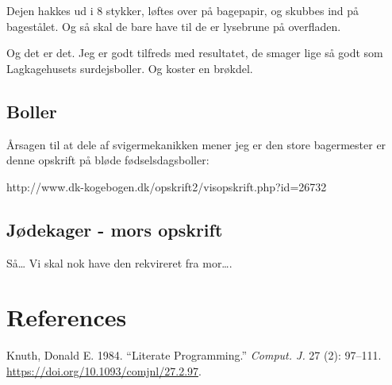 \documentclass[
  letterpaper,
  DIV=11,
  numbers=noendperiod]{scrreprt}
\newlength{\cslhangindent}
\newlength{\cslentryspacingunit} %
\newenvironment{CSLReferences}[2] %
 {%
  \setlength{\parindent}{0pt}
  \ifodd #1
  \let\oldpar\par
  \def\par{\hangindent=\cslhangindent\oldpar}
  \fi
  \setlength{\parskip}{#2\cslentryspacingunit}
 }%
 {}
\begin{document}
Dejen hakkes ud i 8 stykker, løftes over på bagepapir, og skubbes ind på
bagestålet. Og så skal de bare have til de er lysebrune på overfladen.

Og det er det. Jeg er godt tilfreds med resultatet, de smager lige så
godt som Lagkagehusets surdejsboller. Og koster en brøkdel.

\hypertarget{boller}{%
\section{Boller}\label{boller}}

Årsagen til at dele af svigermekanikken mener jeg er den store
bagermester er denne opskrift på bløde fødselsdagsboller:

http://www.dk-kogebogen.dk/opskrift2/visopskrift.php?id=26732

\hypertarget{juxf8dekager---mors-opskrift}{%
\section{Jødekager - mors opskrift}\label{juxf8dekager---mors-opskrift}}

Så\ldots{} Vi skal nok have den rekvireret fra mor\ldots.


\hypertarget{references}{%
\chapter*{References}\label{references}}


\hypertarget{refs}{}
\begin{CSLReferences}{1}{0}
\leavevmode{}%
Knuth, Donald E. 1984. {``Literate Programming.''} \emph{Comput. J.} 27
(2): 97--111. \url{https://doi.org/10.1093/comjnl/27.2.97}.

\end{CSLReferences}
\end{document}
